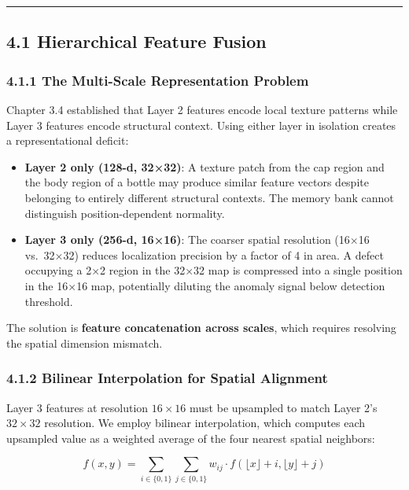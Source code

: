 \begin{center}\rule{0.5\linewidth}{0.5pt}\end{center}

\subsection{4.1 Hierarchical Feature Fusion}\label{hierarchical-feature-fusion}

\subsubsection{4.1.1 The Multi-Scale Representation Problem}\label{the-multi-scale-representation-problem}

Chapter 3.4 established that Layer 2 features encode local texture patterns while Layer 3 features encode structural context. Using either layer in isolation creates a representational deficit:

\begin{itemize}
\item
  \textbf{Layer 2 only (128-d, 32×32)}: A texture patch from the cap region and the body region of a bottle may produce similar feature vectors despite belonging to entirely different structural contexts. The memory bank cannot distinguish position-dependent normality.
\item
  \textbf{Layer 3 only (256-d, 16×16)}: The coarser spatial resolution (16×16 vs.~32×32) reduces localization precision by a factor of 4 in area. A defect occupying a 2×2 region in the 32×32 map is compressed into a single position in the 16×16 map, potentially diluting the anomaly signal below detection threshold.
\end{itemize}

The solution is \textbf{feature concatenation across scales}, which requires resolving the spatial dimension mismatch.

\subsubsection{4.1.2 Bilinear Interpolation for Spatial Alignment}\label{bilinear-interpolation-for-spatial-alignment}

Layer 3 features at resolution \(16 \times 16\) must be upsampled to match Layer 2's \(32 \times 32\) resolution. We employ bilinear interpolation, which computes each upsampled value as a weighted average of the four nearest spatial neighbors:

\[f(x, y) = \sum_{i \in \{0,1\}} \sum_{j \in \{0,1\}} w_{ij} \cdot f(\lfloor x \rfloor + i, \lfloor y \rfloor + j)\]

